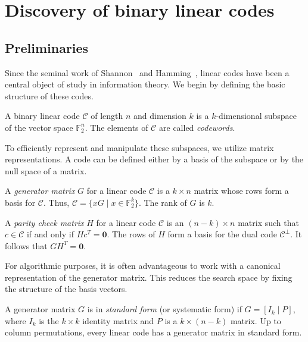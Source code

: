 \section{Discovery of binary linear codes}\label{ch:codes}

\subsection{Preliminaries}

Since the seminal work of Shannon~\cite{Shannon1948} and Hamming~\cite{Hamming1950}, linear codes have been a central object of study in information theory. We begin by defining the basic structure of these codes.

\begin{definition}
A binary linear code $\mathcal{C}$ of length $n$ and dimension $k$ is a $k$-dimensional subspace of the vector space $\mathbb{F}_2^n$. The elements of $\mathcal{C}$ are called \textit{codewords}.
\end{definition}

To efficiently represent and manipulate these subspaces, we utilize matrix representations. A code can be defined either by a basis of the subspace or by the null space of a matrix.

\begin{definition}
A \textit{generator matrix} $G$ for a linear code $\mathcal{C}$ is a $k \times n$ matrix whose rows form a basis for $\mathcal{C}$. Thus, $\mathcal{C} = \{ xG \mid x \in \mathbb{F}_2^k \}$. The rank of $G$ is $k$.
\end{definition}

\begin{definition}
A \textit{parity check matrix} $H$ for a linear code $\mathcal{C}$ is an $(n-k) \times n$ matrix such that $c \in \mathcal{C}$ if and only if $Hc^T = \mathbf{0}$. The rows of $H$ form a basis for the dual code $\mathcal{C}^\perp$. It follows that $GH^T = \mathbf{0}$.
\end{definition}

For algorithmic purposes, it is often advantageous to work with a canonical representation of the generator matrix. This reduces the search space by fixing the structure of the basis vectors.

\begin{definition}
A generator matrix $G$ is in \textit{standard form} (or systematic form) if $G = [I_k \mid P]$, where $I_k$ is the $k \times k$ identity matrix and $P$ is a $k \times (n-k)$ matrix. Up to column permutations, every linear code has a generator matrix in standard form.
\end{definition}

